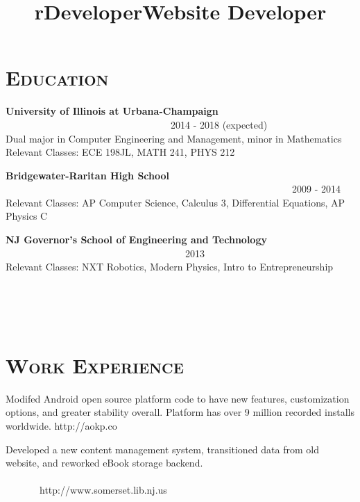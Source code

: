 \begin{resume}
\section{\textsc{Education}}
\textbf{University of Illinois at Urbana-Champaign} \ \ \ \ \ \ \ \ \ \ \ \ \ \ \ \ \ \ \ \ \ \ \ \ \ \ \ \ \ \ \ \ \ \ 2014 - 2018 (expected) \\
Dual major in Computer Engineering and Management, minor in Mathematics \\
Relevant Classes: ECE 198JL, MATH 241, PHYS 212

\textbf{Bridgewater-Raritan High School} \ \ \ \ \ \ \ \ \ \ \ \ \ \ \ \ \ \ \ \ \ \ \ \ \ \ \ \ \ \ \ \ \ \ \ \ \ \ \ \ \ \ \ \ \ \ \ \ \ \ \ \ \ \ \ \ \ \ \ 2009 - 2014 \\
Relevant Classes: AP Computer Science, Calculus 3, Differential Equations, AP Physics C

\textbf{NJ Governor's School of Engineering and Technology} \ \ \ \ \ \ \ \ \ \ \ \ \ \ \ \ \ \ \ \ \ \ \ \ \ \ \ \ \ \ \ \ \ \ \ \ \ 2013 \\ 
Relevant Classes: NXT Robotics, Modern Physics, Intro to Entrepreneurship

\begin{formatb}
  \title{r}\\
  \\
  \body\\
\end{formatb}

\section{\textsc{Work Experience}}

\title{Developer}
\begin{position}
Modifed Android open source platform code to have new features, customization options, and greater stability overall. Platform has over 9 million recorded installs worldwide. http://aokp.co
\end{position}

\title{Website Developer}
\begin{position}
Developed a new content management system, transitioned data from old website, and reworked eBook storage backend. \ \ \ \ \ \ \ \ \ \ \ \ \ \ \ \ \ \ \ \ \ \ \ \ \ \ \ \ \ \ \ \ \ \ \ \ \ \ \ \ \ \ \ \ \ \ \ \ \ \ \ \ \ \ \ \ \ \ \ \ \ \ \ \ \ \ \ \ \ \ \ \ \ \ \ \ \ \ \ http://www.somerset.lib.nj.us
\end{position}


\end{resume}
